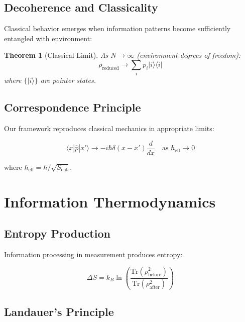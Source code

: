 \documentclass[12pt,a4paper]{article}
\newtheorem{theorem}{Theorem}[section]
\begin{document}
\subsection{Decoherence and Classicality}

Classical behavior emerges when information patterns become sufficiently entangled with environment:

\begin{theorem}[Classical Limit]
As $N \rightarrow \infty$ (environment degrees of freedom):
\begin{equation}
\rho_{\text{reduced}} \rightarrow \sum_i p_i |i\rangle\langle i|
\end{equation}
where $\{|i\rangle\}$ are pointer states.
\end{theorem}

\subsection{Correspondence Principle}

Our framework reproduces classical mechanics in appropriate limits:

\begin{equation}
\langle x|\hat{p}|x'\rangle \rightarrow -i\hbar\delta(x-x')\frac{d}{dx} \quad \text{as } \hbar_{\text{eff}} \rightarrow 0
\end{equation}

where $\hbar_{\text{eff}} = \hbar/\sqrt{S_{\text{ent}}}$.

\section{Information Thermodynamics}

\subsection{Entropy Production}

Information processing in measurement produces entropy:

\begin{equation}
\Delta S = k_B \ln\left(\frac{\text{Tr}(\rho^2_{\text{before}})}{\text{Tr}(\rho^2_{\text{after}})}\right)
\end{equation}

\subsection{Landauer's Principle}
\end{document}
